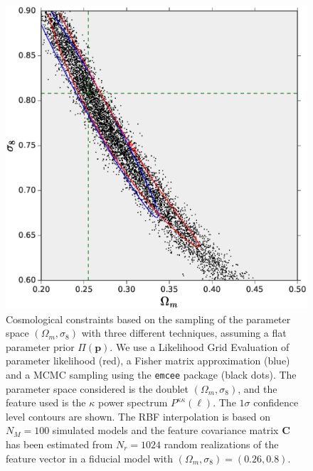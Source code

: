 \documentclass[5p]{elsarticle}
\newcommand{\bb}[1]{\mathbf{#1}}
\newcommand{\ttt}[1]{\texttt{#1}}
\begin{document}
\begin{figure}
\begin{center}
\includegraphics[scale=0.4]{Figures/parameter_sampling.eps}
\caption{Cosmological constraints based on the sampling of the parameter space $(\Omega_m,\sigma_8)$ with three different techniques, assuming a flat parameter prior $\Pi(\bb{p})$. We use a Likelihood Grid Evaluation of parameter likelihood (red), a Fisher matrix approximation (blue) and a MCMC sampling using the \ttt{emcee} package (black dots). The parameter space considered is the doublet $(\Omega_m,\sigma_8)$, and the feature used is the $\kappa$ power spectrum $P^{\kappa\kappa}(\ell)$. The $1\sigma$ confidence level contours are shown. The RBF interpolation is based on $N_M=100$ simulated models and the feature covariance matrix $\bb{C}$ has been estimated from $N_r=1024$ random realizations of the feature vector in a fiducial model with $(\Omega_m,\sigma_8)=(0.26,0.8)$.}
\label{samplingfig}
\end{center}
\end{figure}

\end{document}
